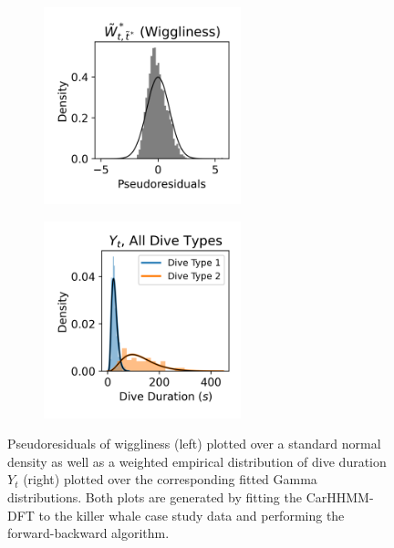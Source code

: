 \begin{figure}[ht]
    \begin{subfigure}{0.45\textwidth}
    	\centering
    	\includegraphics[width=2.25in]{../Plots/2019/20190902-182840-CATs_OB_1_0_267_CarHHMM2_pseudresids_ahat.png}
    \end{subfigure}
    \begin{subfigure}{0.45\textwidth}
    	\centering
    	\includegraphics[width=2.25in]{../Plots/2019/20190902-182840-CATs_OB_1_0_267_CarHHMM2_empirical_hist_dive_duration.png}
    \end{subfigure}
    \caption{Pseudoresiduals of wiggliness (left)
    plotted over a standard normal density as well as a weighted empirical distribution of dive duration $Y_t$ (right) plotted over the corresponding fitted Gamma distributions. Both plots are generated by fitting the CarHHMM-DFT to the killer whale case study data and performing the forward-backward algorithm.}
    \label{fig:model_checking}
\end{figure}


